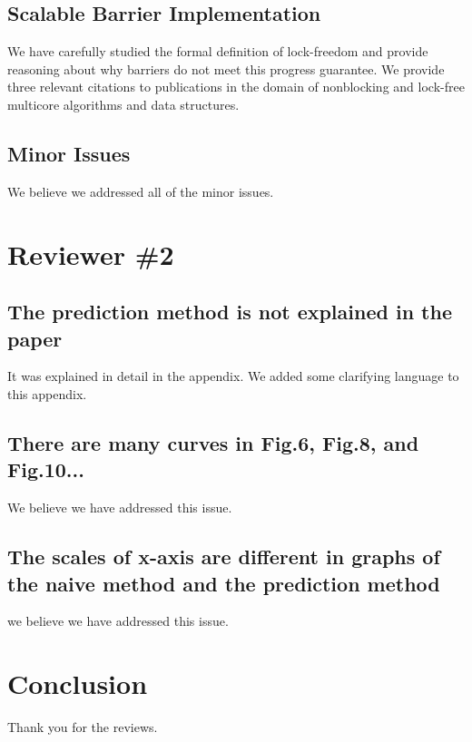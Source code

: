 \documentclass[letterpaper,10pt]{article}
\begin{document}
\subsection{Scalable Barrier Implementation}
We have carefully studied the formal definition of lock-freedom and provide reasoning about why barriers do not meet this progress guarantee.
We provide three relevant citations to publications in the domain of nonblocking and lock-free multicore algorithms and data structures.

\subsection{Minor Issues}
We believe we addressed all of the minor issues.

\section{Reviewer \#2}
\subsection{The prediction method is not explained in the paper}
It was explained in detail in the appendix.  We added some clarifying language to this appendix.
\subsection{There are many curves in Fig.6, Fig.8, and Fig.10...}
We believe we have addressed this issue.
\subsection{The scales of x-axis are different in graphs of the naive method and the prediction method}
we believe we have addressed this issue.

\section{Conclusion}
Thank you for the reviews.  
\end{document}
